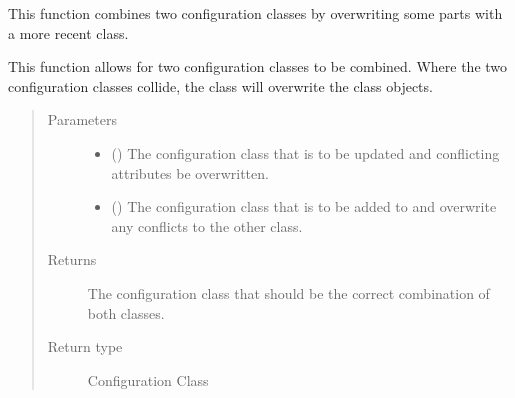 \documentclass[letterpaper,10pt,english]{sphinxmanual}
\begin{document}
\begin{fulllineitems}
\label{\detokenize{python_docstrings/IfA_Smeargle.yankee.yankee_functions:IfA_Smeargle.yankee.yankee_functions.yankee_overwrite_configuration_class}}
This function combines two configuration classes by overwriting some
parts with a more recent class.

This function allows for two configuration classes to be combined. Where
the two configuration classes collide, the  class will
overwrite the  class objects.
\begin{quote}\begin{description}
\item[{Parameters}] \leavevmode\begin{itemize}
\item {} 
 () \textendash{} The configuration class that is to be updated and conflicting
attributes be overwritten.

\item {} 
 () \textendash{} The configuration class that is to be added to and overwrite any
conflicts to the other class.

\end{itemize}

\item[{Returns}] \leavevmode
{} \textendash{} The configuration class that should be the correct combination of
both classes.

\item[{Return type}] \leavevmode
Configuration Class

\end{description}\end{quote}

\end{fulllineitems}

\end{document}
